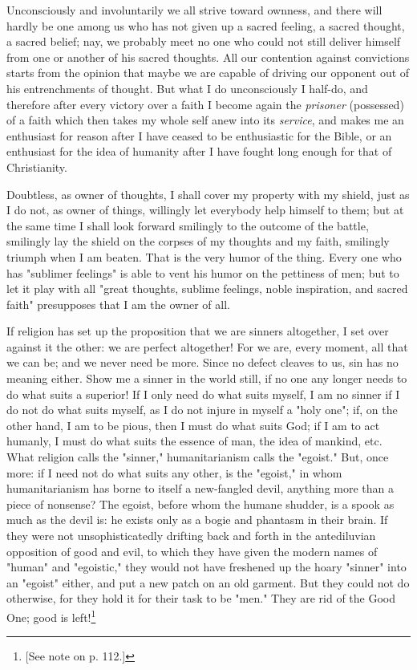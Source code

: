 Unconsciously and involuntarily we all strive toward ownness, and there will 
hardly be one among us who has not given up a sacred feeling, a sacred 
thought, a sacred belief; nay, we probably meet no one who could not still 
deliver himself from one or another of his sacred thoughts. All our contention 
against convictions starts from the opinion that maybe we are capable of 
driving our opponent out of his entrenchments of thought. But what I do 
unconsciously I half-do, and therefore after every victory over a faith I 
become again the \textit{prisoner} (possessed) of a faith which then takes my 
whole self anew into its \textit{service}, and makes me an enthusiast for 
reason after I have ceased to be enthusiastic for the Bible, or an enthusiast 
for the idea of humanity after I have fought long enough for that of 
Christianity.

Doubtless, as owner of thoughts, I shall cover my property with my shield, 
just as I do not, as owner of things, willingly let everybody help himself to 
them; but at the same time I shall look forward smilingly to the outcome of 
the battle, smilingly lay the shield on the corpses of my thoughts and my 
faith, smilingly triumph when I am beaten. That is the very humor of the 
thing. Every one who has "{}sublimer feelings"{} is able to vent his humor on 
the pettiness of men; but to let it play with all "{}great thoughts, sublime 
feelings, noble inspiration, and sacred faith"{} presupposes that I am the 
owner of all.

If religion has set up the proposition that we are sinners altogether, I set 
over against it the other: we are perfect altogether! For we are, every 
moment, all that we can be; and we never need be more. Since no defect cleaves 
to us, sin has no meaning either. Show me a sinner in the world still, if no 
one any longer needs to do what suits a superior! If I only need do what suits 
myself, I am no sinner if I do not do what suits myself, as I do not injure in 
myself a "{}holy one"{}; if, on the other hand, I am to be pious, then I must 
do what suits God; if I am to act humanly, I must do what suits the essence of 
man, the idea of mankind, etc. What religion calls the "{}sinner,"{} 
humanitarianism calls the "{}egoist."{} But, once more: if I need not do what 
suits any other, is the "{}egoist,"{} in whom humanitarianism has borne to 
itself a new-fangled devil, anything more than a piece of nonsense? The 
egoist, before whom the humane shudder, is a spook as much as the devil is: he 
exists only as a bogie and phantasm in their brain. If they were not 
unsophisticatedly drifting back and forth in the antediluvian opposition of 
good and evil, to which they have given the modern names of "{}human"{} and 
"{}egoistic,"{} they would not have freshened up the hoary "{}sinner"{} into 
an "{}egoist"{} either, and put a new patch on an old garment. But they could 
not do otherwise, for they hold it for their task to be "{}men."{} They are 
rid of the Good One; good is left!\footnote{[See note on p. 112.]}

